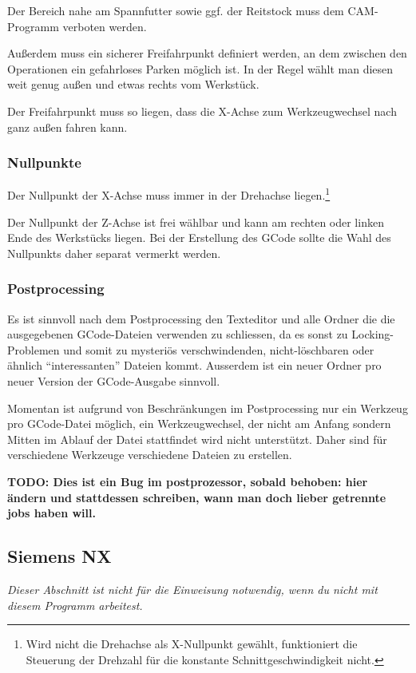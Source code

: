\documentclass{\basedir/fablab-document}
\newcommand{\todoUnwichtig}[1]{\textbf{TODO: #1} }
\begin{document}
Der Bereich nahe am Spannfutter sowie ggf. der Reitstock muss dem CAM-Programm verboten werden.

Außerdem muss ein sicherer Freifahrpunkt definiert werden, an dem zwischen den Operationen ein gefahrloses Parken möglich ist. In der Regel wählt man diesen weit genug außen und etwas rechts vom Werkstück.

Der Freifahrpunkt muss so liegen, dass die X-Achse zum Werkzeugwechsel nach ganz außen fahren kann.

\subsubsection{Nullpunkte} \label{sec:cnc-erstellung.allg.nullpunkte}
Der Nullpunkt der X-Achse muss immer in der Drehachse liegen.\footnote{Wird nicht die Drehachse als X-Nullpunkt gewählt, funktioniert die Steuerung der Drehzahl für die konstante Schnittgeschwindigkeit nicht.}

Der Nullpunkt der Z-Achse ist frei wählbar und kann am rechten oder linken Ende des Werkstücks liegen. Bei der Erstellung des GCode sollte die Wahl des Nullpunkts daher separat vermerkt werden.

\subsubsection{Postprocessing}
Es ist sinnvoll nach dem Postprocessing den Texteditor und alle Ordner die die ausgegebenen
GCode-Dateien verwenden zu schliessen, da es sonst zu Locking-Problemen und
somit zu mysteriös verschwindenden, nicht-löschbaren oder ähnlich
"`interessanten"' Dateien kommt. Ausserdem ist ein neuer Ordner pro neuer
Version der GCode-Ausgabe sinnvoll.

Momentan ist aufgrund von Beschränkungen im Postprocessing nur ein Werkzeug pro GCode-Datei möglich, ein Werkzeugwechsel, der nicht am Anfang sondern Mitten im Ablauf der Datei stattfindet wird nicht unterstützt. Daher sind für verschiedene Werkzeuge verschiedene Dateien zu erstellen.

\todoUnwichtig{Dies ist ein Bug im postprozessor, sobald behoben: hier ändern und stattdessen schreiben, wann man doch lieber getrennte jobs haben will.}


\subsection{Siemens NX}
\emph{Dieser Abschnitt ist nicht für die Einweisung notwendig, wenn du nicht mit diesem Programm arbeitest.}
\end{document}

